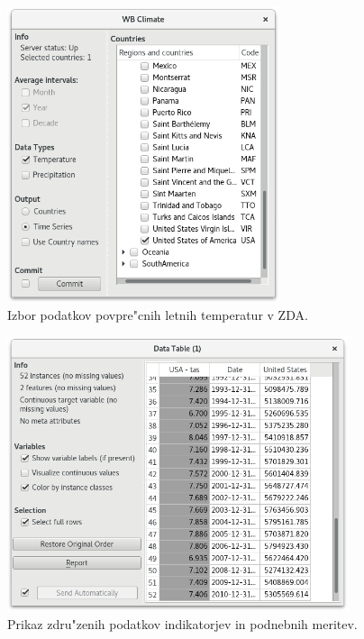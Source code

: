 \begin{figure}
\begin{center}
\includegraphics[width=8cm]{pic/var_climate_select.png}
\end{center}
\caption{Izbor podatkov povpre"cnih letnih temperatur v ZDA.}
\label{co2_temp_forecast}
\end{figure} 

\begin{figure}
\begin{center}
\includegraphics[width=10cm]{pic/var_data_table.png}
\end{center}
\caption{Prikaz zdru"zenih podatkov indikatorjev in podnebnih meritev.}
\label{co2_temp_forecast}
\end{figure} 

